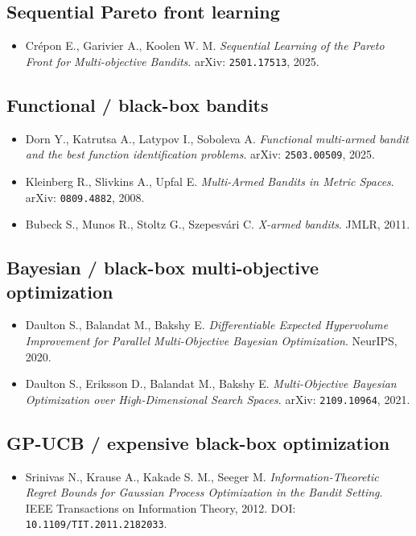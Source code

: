 \documentclass[11pt,a4paper]{article}
\begin{document}
\subsection*{Sequential Pareto front learning}
\begin{itemize}
    \item Crépon E., Garivier A., Koolen W. M. \emph{Sequential Learning of the Pareto Front for Multi-objective Bandits}. arXiv: \texttt{2501.17513}, 2025.
\end{itemize}

\subsection*{Functional / black-box bandits}
\begin{itemize}
    \item Dorn Y., Katrutsa A., Latypov I., Soboleva A. \emph{Functional multi-armed bandit and the best function identification problems}. arXiv: \texttt{2503.00509}, 2025.
    \item Kleinberg R., Slivkins A., Upfal E. \emph{Multi-Armed Bandits in Metric Spaces}. arXiv: \texttt{0809.4882}, 2008.
    \item Bubeck S., Munos R., Stoltz G., Szepesvári C. \emph{X-armed bandits}. JMLR, 2011.
\end{itemize}

\subsection*{Bayesian / black-box multi-objective optimization}
\begin{itemize}
    \item Daulton S., Balandat M., Bakshy E. \emph{Differentiable Expected Hypervolume Improvement for Parallel Multi-Objective Bayesian Optimization}. NeurIPS, 2020.
    \item Daulton S., Eriksson D., Balandat M., Bakshy E. \emph{Multi-Objective Bayesian Optimization over High-Dimensional Search Spaces}. arXiv: \texttt{2109.10964}, 2021.
\end{itemize}

\subsection*{GP-UCB / expensive black-box optimization}
\begin{itemize}
    \item Srinivas N., Krause A., Kakade S. M., Seeger M. \emph{Information-Theoretic Regret Bounds for Gaussian Process Optimization in the Bandit Setting}. IEEE Transactions on Information Theory, 2012. DOI: \texttt{10.1109/TIT.2011.2182033}.
\end{itemize}
\end{document}
